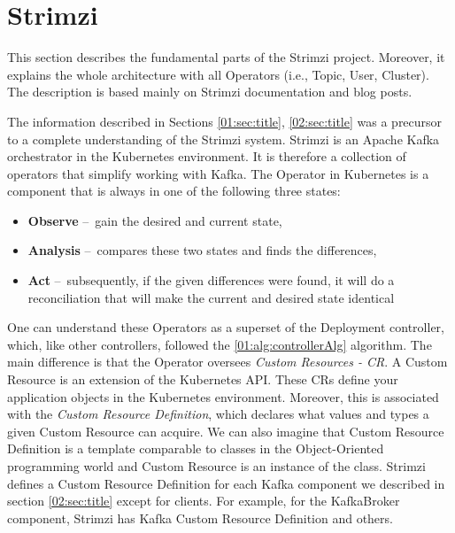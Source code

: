 \section{Strimzi}
\label{03:title}

This section describes the fundamental parts of the Strimzi project.
Moreover, it explains the whole architecture with all Operators (i.e., Topic, User, Cluster).
The description is based mainly on Strimzi documentation and blog posts\cite{strimziDoc, strimziBlogPosts}.

The information described in Sections \ref{01:sec:title}, \ref{02:sec:title} was a precursor to a complete understanding of the Strimzi system.
Strimzi is an Apache Kafka orchestrator in the Kubernetes environment.
It is therefore a collection of operators that simplify working with Kafka.
The Operator in Kubernetes is a component that is always in one of the following three states:
\begin{itemize}[itemsep=1mm, parsep=0pt]
    \item \textbf{Observe} \---\ gain the desired and current state,
    \item \textbf{Analysis} \---\ compares these two states and finds the differences,
    \item \textbf{Act} \---\ subsequently, if the given differences were found, it will do a reconciliation that will make the current and desired state identical
\end{itemize}

One can understand these Operators as a superset of the Deployment controller, which, like other controllers, followed the \ref{01:alg:controllerAlg} algorithm.
The main difference is that the Operator oversees \emph{Custom Resources - CR}.
A Custom Resource is an extension of the Kubernetes API. These CRs define your application objects in the Kubernetes environment.
Moreover, this is associated with the \emph{Custom Resource Definition}, which declares what values and types a given Custom Resource can acquire.
We can also imagine that Custom Resource Definition is a template comparable to classes in the Object-Oriented programming world and Custom Resource is an instance of the class.
Strimzi defines a Custom Resource Definition for each Kafka component we described in section \ref{02:sec:title} except for clients.
For example, for the KafkaBroker component, Strimzi has Kafka Custom Resource Definition and others.

